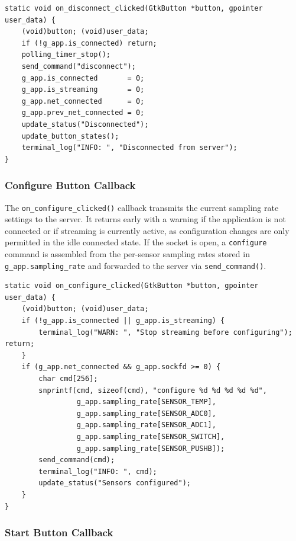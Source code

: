 \begin{verbatim}
static void on_disconnect_clicked(GtkButton *button, gpointer user_data) {
    (void)button; (void)user_data;
    if (!g_app.is_connected) return;
    polling_timer_stop();
    send_command("disconnect");
    g_app.is_connected       = 0;
    g_app.is_streaming       = 0;
    g_app.net_connected      = 0;
    g_app.prev_net_connected = 0;
    update_status("Disconnected");
    update_button_states();
    terminal_log("INFO: ", "Disconnected from server");
}
\end{verbatim}

\subsubsection{Configure Button Callback}

The \texttt{on\_configure\_clicked()} callback transmits the current
sampling rate settings to the server. It returns early with a warning if
the application is not connected or if streaming is currently active,
as configuration changes are only permitted in the idle connected state.
If the socket is open, a \texttt{configure} command is assembled from
the per-sensor sampling rates stored in \texttt{g\_app.sampling\_rate}
and forwarded to the server via \texttt{send\_command()}.

\begin{verbatim}
static void on_configure_clicked(GtkButton *button, gpointer user_data) {
    (void)button; (void)user_data;
    if (!g_app.is_connected || g_app.is_streaming) {
        terminal_log("WARN: ", "Stop streaming before configuring"); return;
    }
    if (g_app.net_connected && g_app.sockfd >= 0) {
        char cmd[256];
        snprintf(cmd, sizeof(cmd), "configure %d %d %d %d %d",
                 g_app.sampling_rate[SENSOR_TEMP],
                 g_app.sampling_rate[SENSOR_ADC0],
                 g_app.sampling_rate[SENSOR_ADC1],
                 g_app.sampling_rate[SENSOR_SWITCH],
                 g_app.sampling_rate[SENSOR_PUSHB]);
        send_command(cmd);
        terminal_log("INFO: ", cmd);
        update_status("Sensors configured");
    }
}
\end{verbatim}

\subsubsection{Start Button Callback}

